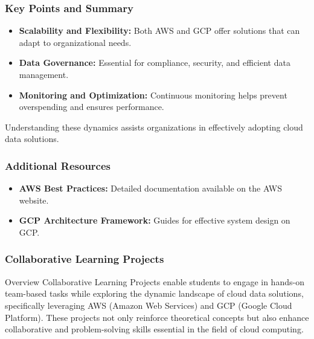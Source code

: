 \documentclass[aspectratio=169]{beamer}
\begin{document}
\begin{frame}[fragile]
    \frametitle{Key Points and Summary}
    \begin{itemize}
        \item \textbf{Scalability and Flexibility:} Both AWS and GCP offer solutions that can adapt to organizational needs.
        \item \textbf{Data Governance:} Essential for compliance, security, and efficient data management.
        \item \textbf{Monitoring and Optimization:} Continuous monitoring helps prevent overspending and ensures performance.
    \end{itemize}
    Understanding these dynamics assists organizations in effectively adopting cloud data solutions.
\end{frame}

\begin{frame}[fragile]
    \frametitle{Additional Resources}
    \begin{itemize}
        \item \textbf{AWS Best Practices:} Detailed documentation available on the AWS website.
        \item \textbf{GCP Architecture Framework:} Guides for effective system design on GCP.
    \end{itemize}
\end{frame}

\begin{frame}[fragile]
    \frametitle{Collaborative Learning Projects}
    \begin{block}{Overview}
    Collaborative Learning Projects enable students to engage in hands-on team-based tasks while exploring the dynamic landscape of cloud data solutions, specifically leveraging AWS (Amazon Web Services) and GCP (Google Cloud Platform). These projects not only reinforce theoretical concepts but also enhance collaborative and problem-solving skills essential in the field of cloud computing.
    \end{block}
\end{frame}
\end{document}
